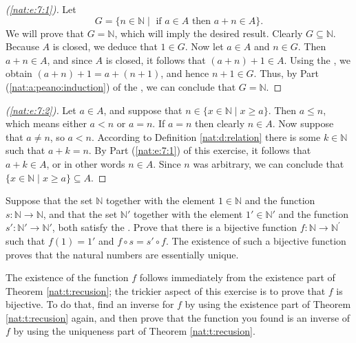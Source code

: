 \begin{proof}[(\ref{nat:e:7:1})]
	Let
	$$
		G = \{ n \in \mathbb{N} \mid \text{ if } a \in A \text{ then } a + n \in A \}.
	$$
	We will prove that $G = \mathbb{N}$, which will imply the desired result. Clearly $G \subseteq \mathbb{N}$. Because $A$ is closed, we deduce that $1 \in G$. Now let $a \in A$ and $n \in G$. Then $a + n \in A$, and since $A$ is closed, it follows that $(a + n) + 1 \in A$. Using the , we obtain $(a + n) + 1 = a + (n + 1)$, and hence $n + 1 \in G$. Thus, by Part (\ref{nat:a:peano:induction}) of the , we can conclude that $G = \mathbb{N}$.
\end{proof}

\begin{proof}[(\ref{nat:e:7:2})]
	Let $a \in A$, and suppose that $n \in \{ x \in \mathbb{N} \mid x \geq a \}$. Then $a \leq n$, which means either $a < n$ or $a = n$. If $a = n$ then clearly $n \in A$. Now suppose that $a \not= n$, so $a < n$. According to Definition \ref{nat:d:relation} there is some $k \in \mathbb{N}$ such that $a + k = n$. By Part (\ref{nat:e:7:1}) of this exercise, it follows that $a + k \in A$, or in other words $n \in A$. Since $n$ was arbitrary, we can conclude that $\{ x \in \mathbb{N} \mid x \geq a \} \subseteq A$.
\end{proof}


\Newpage
\begin{exercise} %
	Suppose that the set $\mathbb{N}$ together with the element $1 \in \mathbb{N}$ and the function $s: \mathbb{N} \to \mathbb{N}$, and that the set $\mathbb{N}'$ together with the element $1' \in \mathbb{N}'$ and the function $s': \mathbb{N}' \to \mathbb{N}'$, both satisfy the . Prove that there is a bijective function $f: \mathbb{N} \to \mathbb{N}^{\prime}$ such that $f(1)=1'$ and $f \circ s=s' \circ f$. The existence of such a bijective function proves that the natural numbers are essentially unique.

	The existence of the function $f$ follows immediately from the existence part of Theorem \ref{nat:t:recusion}; the trickier aspect of this exercise is to prove that $f$ is bijective. To do that, find an inverse for $f$ by using the existence part of Theorem \ref{nat:t:recusion} again, and then prove that the function you found is an inverse of $f$ by using the uniqueness part of Theorem \ref{nat:t:recusion}.
\end{exercise}

